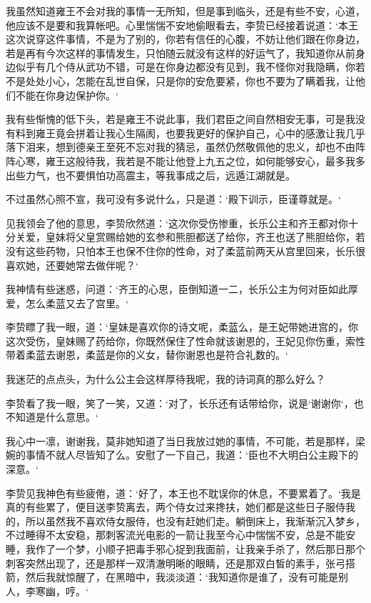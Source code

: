 我虽然知道雍王不会对我的事情一无所知，但是事到临头，还是有些不安，心道，他应该不是要和我算帐吧。心里惴惴不安地偷眼看去，李贽已经接着说道：‘本王这次说穿这件事情，不是为了别的，你若有信任的心腹，不妨让他们跟在你身边，若是再有今次这样的事情发生，只怕随云就没有这样的好运气了，我知道你从前身边似乎有几个侍从武功不错，可是在你身边都没有见到，我不怪你对我隐瞒，你若不是处处小心，怎能在乱世自保，只是你的安危要紧，你也不要为了瞒着我，让他们不能在你身边保护你。‘

我有些惭愧的低下头，若是雍王不说此事，我们君臣之间自然相安无事，可是我没有料到雍王竟会拼着让我心生隔阂，也要我更好的保护自己，心中的感激让我几乎落下泪来，想到德亲王至死不忘对我的猜忌，虽然仍然敬佩他的忠义，却也不由阵阵心寒，雍王这般待我，我若是不能让他登上九五之位，如何能够安心，最多我多出些力气，也不要惧怕功高震主，等我事成之后，远遁江湖就是。

不过虽然心照不宣，我可没有多说什么，只是道：‘殿下训示，臣谨尊就是。‘

见我领会了他的意思，李贽欣然道：‘这次你受伤惨重，长乐公主和齐王都对你十分关爱，皇妹将父皇赏赐给她的玄参和熊胆都送了给你，齐王也送了熊胆给你，若没有这些药物，只怕本王也保不住你的性命，对了柔蓝前两天从宫里回来，长乐很喜欢她，还要她常去做伴呢？‘

我神情有些迷惑，问道：‘齐王的心思，臣倒知道一二，长乐公主为何对臣如此厚爱，怎么柔蓝又去了宫里。‘

李贽瞟了我一眼，道：‘皇妹是喜欢你的诗文呢，柔蓝么，是王妃带她进宫的，你这次受伤，皇妹赐了药给你，你既然保住了性命就该谢恩的，王妃见你伤重，索性带着柔蓝去谢恩，柔蓝是你的义女，替你谢恩也是符合礼数的。‘

我迷茫的点点头，为什么公主会这样厚待我呢，我的诗词真的那么好么？

李贽看了我一眼，笑了一笑，又道：‘对了，长乐还有话带给你，说是‘谢谢你‘，也不知道是什么意思。‘

我心中一凛，谢谢我，莫非她知道了当日我放过她的事情，不可能，若是那样，梁婉的事情不就人尽皆知了么。安慰了一下自己，我道：‘臣也不大明白公主殿下的深意。‘

李贽见我神色有些疲倦，道：‘好了，本王也不耽误你的休息，不要累着了。‘我是真的有些累了，便目送李贽离去，两个侍女过来搀扶，她们都是这些日子服侍我的，所以虽然我不喜欢侍女服侍，也没有赶她们走。躺倒床上，我渐渐沉入梦乡，不过睡得不太安稳，那刺客流光电影的一箭让我至今心中惴惴不安，总是不能安睡，我作了一个梦，小顺子把毒手邪心捉到我面前，让我亲手杀了，然后那日那个刺客突然出现了，还是那样一双清澈明晰的眼睛，还是那双白皙的素手，张弓搭箭，然后我就惊醒了，在黑暗中，我淡淡道：‘我知道你是谁了，没有可能是别人，李寒幽，哼。‘

